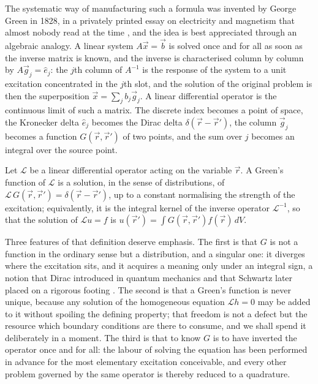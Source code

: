 		The systematic way of manufacturing such a formula was invented by George Green in 1828, in a privately printed essay on electricity and magnetism that almost nobody read at the time \citep{green1828essay}, and the idea is best appreciated through an algebraic analogy. A linear system $A\vec{x} = \vec{b}$ is solved once and for all as soon as the inverse matrix is known, and the inverse is characterised column by column by $A\vec{g}_{j} = \hat{e}_{j}$: the $j$th column of $A^{-1}$ is the response of the system to a unit excitation concentrated in the $j$th slot, and the solution of the original problem is then the superposition $\vec{x} = \sum_{j} b_{j}\vec{g}_{j}$. A linear differential operator is the continuous limit of such a matrix. The discrete index becomes a point of space, the Kronecker delta $\hat{e}_{j}$ becomes the Dirac delta $\delta(\vec{r}-\vec{r}')$, the column $\vec{g}_{j}$ becomes a function $G(\vec{r},\vec{r}')$ of two points, and the sum over $j$ becomes an integral over the source point.

		\begin{myDef}
			Let $\mathcal{L}$ be a linear differential operator acting on the variable $\vec{r}$. A Green's function of $\mathcal{L}$ is a solution, in the sense of distributions, of $\mathcal{L}\,G(\vec{r},\vec{r}') = \delta(\vec{r}-\vec{r}')$, up to a constant normalising the strength of the excitation; equivalently, it is the integral kernel of the inverse operator $\mathcal{L}^{-1}$, so that the solution of $\mathcal{L}u = f$ is $u(\vec{r}') = \int G(\vec{r},\vec{r}')f(\vec{r})\,dV$.
		\end{myDef}

		Three features of that definition deserve emphasis. The first is that $G$ is not a function in the ordinary sense but a distribution, and a singular one: it diverges where the excitation sits, and it acquires a meaning only under an integral sign, a notion that Dirac introduced in quantum mechanics \citep{dirac1930principles} and that Schwartz later placed on a rigorous footing \citep{schwartz1950theorie}. The second is that a Green's function is never unique, because any solution of the homogeneous equation $\mathcal{L}h = 0$ may be added to it without spoiling the defining property; that freedom is not a defect but the resource which boundary conditions are there to consume, and we shall spend it deliberately in a moment. The third is that to know $G$ is to have inverted the operator once and for all: the labour of solving the equation has been performed in advance for the most elementary excitation conceivable, and every other problem governed by the same operator is thereby reduced to a quadrature.

